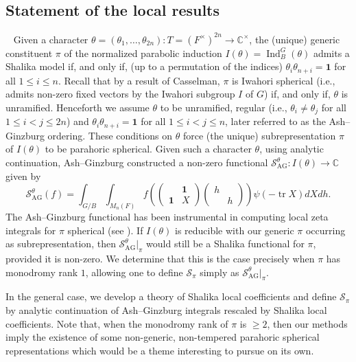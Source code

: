 \documentclass{amsart}
\theoremstyle{definition}
\newcommand{\tr}{\operatorname{tr}}
\newcommand{\Ind}{\operatorname{Ind}}
\newcommand{\AG}{\operatorname{AG}}
\begin{document}
{\subsection{Statement of the local results}~\label{sec:local}
Given a character $\theta=(\theta_1,\dots,\theta_{2n}) : T=(F^\times)^{2n}\to \mathbb{C}^\times$, the (unique) generic constituent $\pi$   
of  the normalized parabolic induction $I(\theta)=\Ind_B^G (\theta)$ admits a Shalika model if, and only if, (up to a permutation of the indices)
$\theta_i\theta_{n+i}=\mathbf{1}$ for all $1\leqslant i\leqslant n$. Recall that by  a result of Casselman, $\pi$ is Iwahori spherical (i.e.,  admits non-zero fixed vectors by the Iwahori subgroup $I$ of $G$) if, and only if,  $\theta$ is unramified. 
Henceforth we assume $\theta$ to be unramified, regular (i.e., $\theta_i\neq\theta_j$ for all  $1\leqslant i<j \leqslant 2n$)  and 
$\theta_i\theta_{n+i}=\mathbf{1}$ for all  $1\leqslant i<j \leqslant n$, later referred to as the Ash--Ginzburg ordering. 
 These conditions on $\theta$ force  (the unique) subrepresentation $\pi$ of $I(\theta)$ to be parahoric spherical. 
Given such a character $\theta$, using analytic continuation,  Ash--Ginzburg \cite{AG}  constructed a non-zero functional 
$\mathcal{S}^\theta_{\AG}:I(\theta)\to \mathbb{C}$ given by
\[\mathcal{S}^\theta_{\AG}(f)=\int_{G/B}\int_{M_n(F)}f
\left(\begin{pmatrix}
  & \mathbf{1}\\  \mathbf{1} & X\end{pmatrix}\begin{pmatrix}
h&\\&h\end{pmatrix}\right)\psi(-\tr X)dXdh.\]
 The  Ash--Ginzburg functional has been instrumental in computing local zeta integrals
for $\pi$ spherical (see \cite{AG,DJR,BDW,BDGJW}). If $I(\theta)$ is reducible with our generic $\pi$ occurring as 
 subrepresentation, then $\mathcal{S}^\theta_{\AG}|_\pi$ would still be  a Shalika functional  for $\pi$, provided it is non-zero. 
 We determine that this is the case precisely when $\pi$ has monodromy rank  $1$, allowing one to define $\mathcal{S}_\pi$
 simply as $\mathcal{S}^\theta_{\AG}|_\pi$. 
 
In the general case, we develop a theory of Shalika local coefficients and  define $\mathcal{S}_\pi$ by analytic continuation of Ash--Ginzburg integrals rescaled by Shalika local coefficients. Note that, when the monodromy rank of $\pi$ is $\geqslant 2$, then our methods imply the  existence of some non-generic, non-tempered 
parahoric spherical representations which would be a theme interesting to pursue on its own.  
 

}
\end{document}
